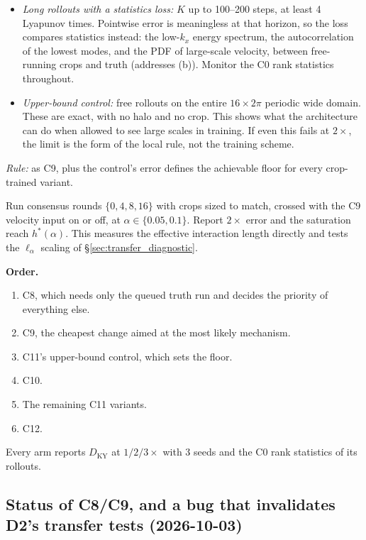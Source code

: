 \documentclass[11pt]{article}
\begin{document}
\begin{description}[leftmargin=*]
\begin{itemize}[leftmargin=*]
    the interior must sustain its own large scales (addresses (a)).
  \item \emph{Long rollouts with a statistics loss:} $K$ up to 100--200
    steps, at least 4 Lyapunov times. Pointwise error is meaningless at
    that horizon, so the loss compares statistics instead: the low-$k_x$
    energy spectrum, the autocorrelation of the lowest modes, and the PDF
    of large-scale velocity, between free-running crops and truth
    (addresses (b)). Monitor the C0 rank statistics throughout.
  \item \emph{Upper-bound control:} free rollouts on the entire
    $16\times2\pi$ periodic wide domain. These are exact, with no halo
    and no crop. This shows what the architecture can do when allowed to
    see large scales in training. If even this fails at $2\times$, the
    limit is the form of the local rule, not the training scheme.
  \end{itemize}
  \emph{Rule:} as C9, plus the control's error defines the achievable
  floor for every crop-trained variant.
\item[C12 --- reach sweep (P3 realized).] Run consensus rounds
  $\{0,4,8,16\}$ with crops sized to match, crossed with the C9 velocity
  input on or off, at $\alpha\in\{0.05,0.1\}$. Report $2\times$ error and
  the saturation reach $h^*(\alpha)$. This measures the effective
  interaction length directly and tests the $\ell_\alpha$ scaling of
  \S\ref{sec:transfer_diagnostic}.
\end{description}

\textbf{Order.}
\begin{enumerate}[leftmargin=*]
\item C8, which needs only the queued truth run and decides the priority
  of everything else.
\item C9, the cheapest change aimed at the most likely mechanism.
\item C11's upper-bound control, which sets the floor.
\item C10.
\item The remaining C11 variants.
\item C12.
\end{enumerate}
Every arm reports $D_{\mathrm{KY}}$ at $1/2/3\times$ with 3 seeds and the
C0 rank statistics of its rollouts.

\subsection{Status of C8/C9, and a bug that invalidates D2's transfer tests (2026-10-03)}
\label{sec:c8c9_status}
\end{document}
